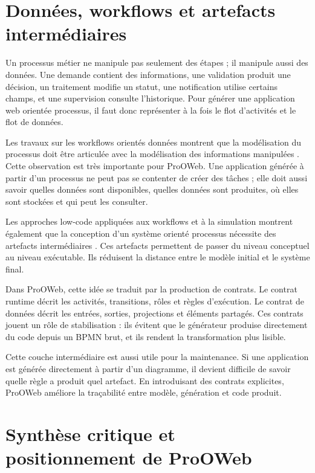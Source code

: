 \documentclass[12pt,a4paper]{article}
\begin{document}
\section{Données, workflows et artefacts intermédiaires}

Un processus métier ne manipule pas seulement des étapes ; il manipule aussi des données. Une demande contient des informations, une validation produit une décision, un traitement modifie un statut, une notification utilise certains champs, et une supervision consulte l'historique. Pour générer une application web orientée processus, il faut donc représenter à la fois le flot d'activités et le flot de données.

Les travaux sur les workflows orientés données montrent que la modélisation du processus doit être articulée avec la modélisation des informations manipulées \cite{swel2023}. Cette observation est très importante pour ProOWeb. Une application générée à partir d'un processus ne peut pas se contenter de créer des tâches ; elle doit aussi savoir quelles données sont disponibles, quelles données sont produites, où elles sont stockées et qui peut les consulter.

Les approches low-code appliquées aux workflows et à la simulation montrent également que la conception d'un système orienté processus nécessite des artefacts intermédiaires \cite{musicode2025}. Ces artefacts permettent de passer du niveau conceptuel au niveau exécutable. Ils réduisent la distance entre le modèle initial et le système final.

Dans ProOWeb, cette idée se traduit par la production de contrats. Le contrat runtime décrit les activités, transitions, rôles et règles d'exécution. Le contrat de données décrit les entrées, sorties, projections et éléments partagés. Ces contrats jouent un rôle de stabilisation : ils évitent que le générateur produise directement du code depuis un BPMN brut, et ils rendent la transformation plus lisible.

Cette couche intermédiaire est aussi utile pour la maintenance. Si une application est générée directement à partir d'un diagramme, il devient difficile de savoir quelle règle a produit quel artefact. En introduisant des contrats explicites, ProOWeb améliore la traçabilité entre modèle, génération et code produit.

\section{Synthèse critique et positionnement de ProOWeb}
\end{document}
